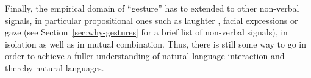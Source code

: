 \documentclass[output=paper]{langsci/langscibook}
\begin{document}
Finally, the empirical domain of \enquote{gesture} has to extended to other non-verbal signals, in particular propositional ones such as laughter \citep{Ginzburg:Breitholz:Cooper:Hough:Tian:2015}, facial expressions or gaze (see Section~\ref{sec:why-gestures} for a brief list of non-verbal signals), in isolation as well as in mutual combination.
%
Thus, there is still some way to go in order to achieve a fuller understanding of natural language interaction and thereby natural languages.


 




{\sloppy
\printbibliography[heading=subbibliography,notkeyword=this]
}
\end{document}
